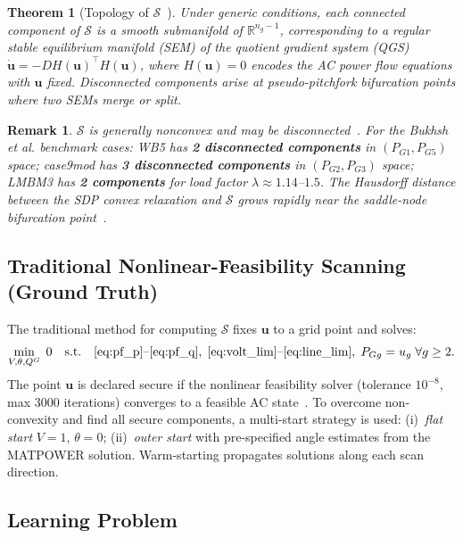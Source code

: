 \documentclass[journal]{IEEEtran}
\newtheorem{theorem}{Theorem}
\newtheorem{remark}{Remark}
\newcommand{\R}{\mathbb{R}}
\newcommand{\SSR}{\mathcal{S}}
\begin{document}
\begin{theorem}[Topology of $\SSR$~\cite{jiang2017feasibility}]
  Under generic conditions, each connected component of $\SSR$ is a
  smooth submanifold of $\R^{n_g-1}$, corresponding to a \emph{regular stable
  equilibrium manifold} (SEM) of the quotient gradient system (QGS)
  $\dot{\mathbf{u}} = -D H(\mathbf{u})^\top H(\mathbf{u})$, where
  $H(\mathbf{u}) = 0$ encodes the AC power flow equations with $\mathbf{u}$ fixed.
  Disconnected components arise at \emph{pseudo-pitchfork bifurcation points}
  where two SEMs merge or split.
\end{theorem}

\begin{remark}
  $\SSR$ is generally nonconvex and may be \emph{disconnected}~\cite{jiang2017feasibility,bukhsh2013local}.
  For the Bukhsh et al. benchmark cases:
  WB5 has \textbf{2 disconnected components} in $(P_{G1}, P_{G5})$ space;
  case9mod has \textbf{3 disconnected components} in $(P_{G2}, P_{G3})$ space;
  LMBM3 has \textbf{2 components} for load factor $\lambda \approx 1.14$--$1.5$.
  The Hausdorff distance between the SDP convex relaxation and $\SSR$
  grows rapidly near the saddle-node bifurcation point~\cite{fan2024error}.
\end{remark}

\subsection{Traditional Nonlinear-Feasibility Scanning (Ground Truth)}
\label{subsec:traditional_scan}

The traditional method for computing $\SSR$ fixes $\mathbf{u}$ to a
grid point and solves:
\begin{equation}
  \min_{V, \theta, Q^G}\; 0 \quad \text{s.t.} \quad
  \eqref{eq:pf_p}\text{--}\eqref{eq:pf_q},\;
  \eqref{eq:volt_lim}\text{--}\eqref{eq:line_lim},\;
  P_{Gg} = u_g\; \forall g \ge 2.
  \label{eq:feas_prob}
\end{equation}
The point $\mathbf{u}$ is declared secure if the nonlinear feasibility solver
(tolerance $10^{-8}$, max 3000 iterations) converges to a feasible AC state~\cite{bukhsh2013local}.
To overcome non-convexity and find all secure components, a multi-start
strategy is used: (i)~\emph{flat start} $V=1$, $\theta=0$; (ii)~\emph{outer start}
with pre-specified angle estimates from the MATPOWER solution. Warm-starting
propagates solutions along each scan direction.

\subsection{Learning Problem}
\end{document}
